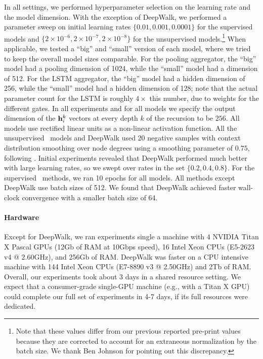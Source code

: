 In all settings, we performed hyperparameter selection on the learning rate and the model dimension.
With the exception of DeepWalk, we performed a parameter sweep on initial learning rates $\{0.01, 0.001, 0.0001\}$ for the supervised models and $\{2\times10^{-6}, 2\times10^{-7}, 2\times10^{-8}\}$ for the unsupervised models.\footnote{Note that these values differ from our previous reported pre-print values because they are corrected to account for an extraneous normalization by the batch size. We thank Ben Johnson for pointing out this discrepancy.}
When applicable, we tested a ``big'' and ``small'' version of each model, where we tried to keep the overall model sizes comparable.
For the pooling aggregator, the ``big'' model had a pooling dimension of 1024, while the ``small'' model had a dimension of  512.
For the LSTM aggregator, the ``big'' model had a hidden dimension of 256, while the ``small'' model had a hidden dimension of 128; note that the actual parameter count for the LSTM is roughly $4{\times}$ this number, due to weights for the different gates. 
In all experiments and for all models we specify the output dimension of the $\mathbf{h}^k_i$ vectors at every depth $k$ of the recursion to be $256$. 
All models use rectified linear units as a non-linear activation function.
All the unsupervised \name\ models and DeepWalk used 20 negative samples with context distribution smoothing over node degrees using a smoothing parameter of $0.75$, following \cite{grover2016node2vec,mikolov2013distributed,perozzi2014deepwalk}.
Initial experiments revealed that DeepWalk performed much better with large learning rates, so we swept over rates in the set $\{0.2,0.4,0.8\}$. 
For the supervised \name\ methods, we ran 10 epochs for all models. 
All methods except DeepWalk use batch sizes of 512.
We found that DeepWalk achieved faster wall-clock convergence with a smaller batch size of 64. 

\paragraph{Hardware}
Except for DeepWalk, we ran experiments single a machine with 4 NVIDIA Titan X Pascal GPUs (12Gb of RAM at 10Gbps speed), 16 Intel Xeon CPUs (E5-2623 v4 @ 2.60GHz), and 256Gb of RAM.  
DeepWalk was faster on a CPU intensive machine with 144 Intel Xeon CPUs (E7-8890 v3 @ 2.50GHz) and 2Tb of RAM. 
Overall, our experiments took about 3 days in a shared resource setting. 
We expect that a consumer-grade single-GPU machine (e.g., with a Titan X GPU) could complete our full set of experiments in 4-7 days, if its full resources were dedicated. 

